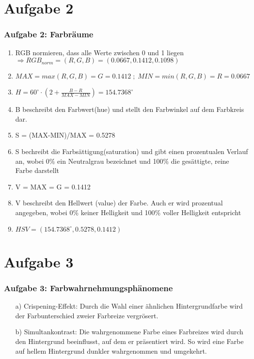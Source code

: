 \documentclass[accentcolor=tud9c,colorbacktitle,inverttitle,landscape,german,presentation,t]{tudbeamer}
\begin{document}
\section{Aufgabe 2}
	\begin{frame}
		\frametitle{Aufgabe 2: Farbräume}
			\begin{enumerate}
			\item RGB normieren, dass alle Werte zwischen 0 und 1 liegen
			$\Rightarrow RGB_{norm} = (R, G, B) = (0.0667, 0.1412, 0.1098)$
			\item $MAX = max(R, G, B) = G = 0.1412 \; ; \; MIN = min(R, G, B) = R = 0.0667$
			\item  $H = 60 ^{\circ} \cdot (2 + \frac{B-R}{MAX-MIN}) = 154.7368^{\circ}$
			\item  B beschreibt den Farbwert(hue) und stellt den Farbwinkel auf dem Farbkreis dar.
			\item S = (MAX-MIN)/MAX = 0.5278
			\item S bechreibt die Farbsättigung(saturation) und gibt einen prozentualen Verlauf an, wobei 0\% ein Neutralgrau bezeichnet und 100\% die gesättigte, reine Farbe darstellt \
			\item V = MAX = G = 0.1412
			\item V beschreibt den Hellwert (value) der Farbe. Auch er wird prozentual angegeben, wobei 0\% keiner Helligkeit und 100\% voller Helligkeit entspricht
			\item $HSV = (154.7368^{\circ}, 0.5278, 0.1412)$
			\end{enumerate}
		\end{frame}

\section{Aufgabe 3}
	\begin{frame}
		\frametitle{Aufgabe 3: Farbwahrnehmungsphänomene}
		\begin{itemize}
			\item[a)]Crispening-Effekt: Durch die Wahl einer ähnlichen Hintergrundfarbe wird der Farbunterschied zweier Farbreize vergrösert.
			\item[b)]Simultankontrast: Die wahrgenommene Farbe eines Farbreizes wird durch den Hintergrund beeinflusst, auf dem er präsentiert wird. So wird eine Farbe auf hellem Hintergrund dunkler wahrgenommen und umgekehrt.
		\end{itemize}
	\end{frame}
\end{document}
